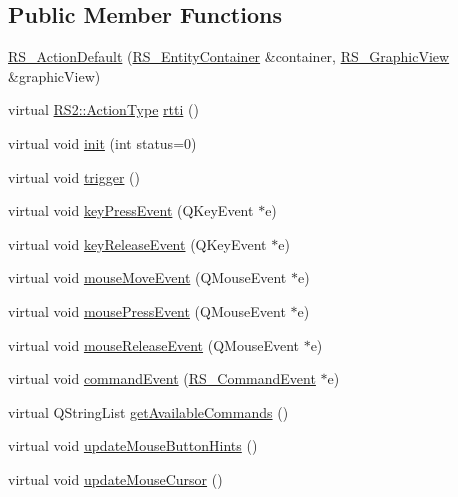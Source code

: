 \subsection*{Public Member Functions}
\begin{DoxyCompactItemize}
\item 
\hyperlink{classRS__ActionDefault_a2982dd8193c5b590a14c480f9b81ac27}{R\-S\-\_\-\-Action\-Default} (\hyperlink{classRS__EntityContainer}{R\-S\-\_\-\-Entity\-Container} \&container, \hyperlink{classRS__GraphicView}{R\-S\-\_\-\-Graphic\-View} \&graphic\-View)
\item 
virtual \hyperlink{classRS2_afe3523e0bc41fd637b892321cfc4b9d7}{R\-S2\-::\-Action\-Type} \hyperlink{classRS__ActionDefault_a1006349b259e10251fafd9da37ef1a0b}{rtti} ()
\item 
virtual void \hyperlink{classRS__ActionDefault_aa1fe85d09bee8ff975833fae1b596ddb}{init} (int status=0)
\item 
virtual void \hyperlink{classRS__ActionDefault_ac17b69f974f99c0993f5d5db81f495b2}{trigger} ()
\item 
virtual void \hyperlink{classRS__ActionDefault_afa74af95dcfe056ce3b25010da79d8b9}{key\-Press\-Event} (Q\-Key\-Event $\ast$e)
\item 
virtual void \hyperlink{classRS__ActionDefault_a36965c9c0165f18106303204f59d2325}{key\-Release\-Event} (Q\-Key\-Event $\ast$e)
\item 
virtual void \hyperlink{classRS__ActionDefault_a5c874399d41cc918f8c00240bdef9f3c}{mouse\-Move\-Event} (Q\-Mouse\-Event $\ast$e)
\item 
virtual void \hyperlink{classRS__ActionDefault_ad7bddd5242345357d49c9457706d664b}{mouse\-Press\-Event} (Q\-Mouse\-Event $\ast$e)
\item 
virtual void \hyperlink{classRS__ActionDefault_a49a1c31f2ff3311a5535f5fca556e8ce}{mouse\-Release\-Event} (Q\-Mouse\-Event $\ast$e)
\item 
virtual void \hyperlink{classRS__ActionDefault_aaeb4de57685584043ff9a520f511f8d3}{command\-Event} (\hyperlink{classRS__CommandEvent}{R\-S\-\_\-\-Command\-Event} $\ast$e)
\item 
virtual Q\-String\-List \hyperlink{classRS__ActionDefault_a4368e54834631dc1a63f25574020cd17}{get\-Available\-Commands} ()
\item 
virtual void \hyperlink{classRS__ActionDefault_ab4f16933b76557eb2ab0f87a12dbbe24}{update\-Mouse\-Button\-Hints} ()
\item 
virtual void \hyperlink{classRS__ActionDefault_aa8b587096607c40ae179bfab72e826fa}{update\-Mouse\-Cursor} ()
\end{DoxyCompactItemize}
